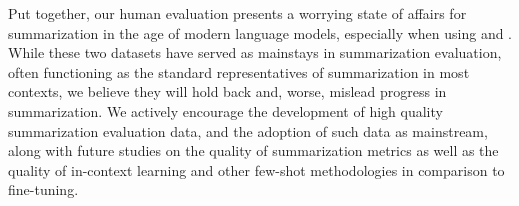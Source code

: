 Put together, our human evaluation presents a worrying state of affairs for summarization in the age of modern language models, especially when using \cnndm and \xsum. 
While these two datasets have served as mainstays in summarization evaluation, often functioning as the standard representatives of summarization in most contexts, we believe they will hold back and, worse, mislead progress in summarization.
We actively encourage the development of high quality summarization evaluation data, and the adoption of such data as mainstream, along with future studies on the quality of summarization metrics as well as the quality of in-context learning and other few-shot methodologies in comparison to fine-tuning.